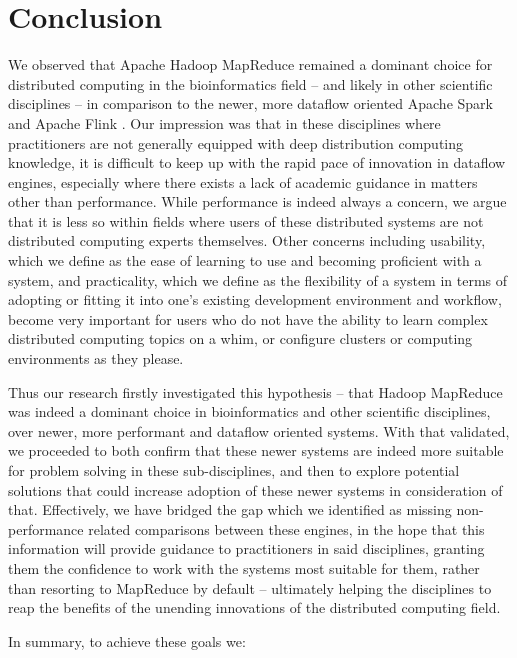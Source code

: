 \chapter{Conclusion}

  We observed that Apache Hadoop MapReduce \cite{HADOOP:HOMEPAGE} remained a dominant choice for distributed computing in the bioinformatics field -- and likely in other scientific disciplines -- in comparison to the newer, more dataflow oriented Apache Spark \cite{SPARK:HOMEPAGE,ZahariaCFSS:HotCloud10} and Apache Flink \cite{FLINK:HOMEPAGE,CarboneKEMHT:DEBU2015}. Our impression was that in these disciplines where practitioners are not generally equipped with deep distribution computing knowledge, it is difficult to keep up with the rapid pace of innovation in dataflow engines, especially where there exists a lack of academic guidance in matters other than performance. While performance is indeed always a concern, we argue that it is less so within fields where users of these distributed systems are not distributed computing experts themselves. Other concerns including usability, which we define as the ease of learning to use and becoming proficient with a system, and practicality, which we define as the flexibility of a system in terms of adopting or fitting it into one's existing development environment and workflow, become very important for users who do not have the ability to learn complex distributed computing topics on a whim, or configure clusters or computing environments as they please.
  
  Thus our research firstly investigated this hypothesis -- that Hadoop MapReduce was indeed a dominant choice in bioinformatics and other scientific disciplines, over newer, more performant and dataflow oriented systems. With that validated, we proceeded to both confirm that these newer systems are indeed more suitable for problem solving in these sub-disciplines, and then to explore potential solutions that could increase adoption of these newer systems in consideration of that. Effectively, we have bridged the gap which we identified as missing non-performance related comparisons between these engines, in the hope that this information will provide guidance to practitioners in said disciplines, granting them the confidence to work with the systems most suitable for them, rather than resorting to MapReduce by default -- ultimately helping the disciplines to reap the benefits of the unending innovations of the distributed computing field.
  
  In summary, to achieve these goals we:
  
